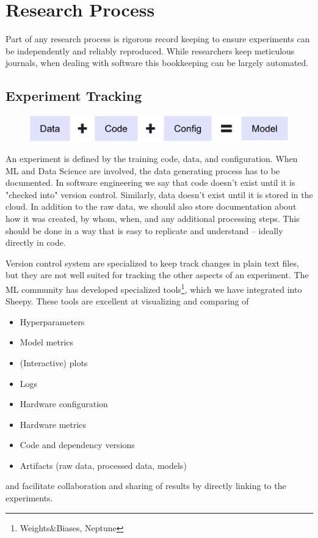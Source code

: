 
\section{Research Process}
Part of any research process is rigorous record keeping to ensure experiments can be independently and reliably reproduced.
While researchers keep meticulous journals, when dealing with software this bookkeeping can be largely automated.

\subsection{Experiment Tracking}
\begin{figure}[h]
    \includegraphics[width=\linewidth]{chapters/NLP/figures/model.png}
    \label{fig:model}
\end{figure}
An experiment is defined by the training code, data, and configuration.
When ML and Data Science are involved, the data generating process has to be documented.
In software engineering we say that code doesn't exist until it is "checked into" version control.
Similarly, data doesn't exist until it is stored in the cloud.
In addition to the raw data, we should also store documentation about how it was created, by whom, when, and any additional processing steps.
This should be done in a way that is easy to replicate and understand -- ideally directly in code.

Version control system are specialized to keep track changes in plain text files, but they are not well suited for tracking the other aspects of an experiment.
The ML community has developed specialized tools\footnote{Weights\&Biases, Neptune}, which we have integrated into Sheepy.
These tools are excellent at visualizing and comparing of
\begin{itemize}
    \item Hyperparameters
    \item Model metrics
    \item (Interactive) plots
    \item Logs
    \item Hardware configuration
    \item Hardware metrics
    \item Code and dependency versions
    \item Artifacts (raw data, processed data, models)
\end{itemize}
and facilitate collaboration and sharing of results by directly linking to the experiments.


